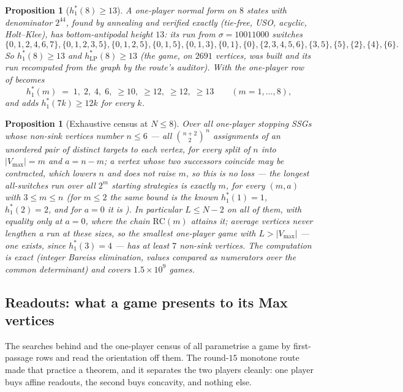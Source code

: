 \documentclass[11pt]{article}
\theoremstyle{plain}
\newtheorem{proposition}[theorem]{Proposition}
\theoremstyle{definition}
\newcommand{\Vmax}{V_{\max}}
\begin{document}
\begin{proposition}[$h^{\ast}_{1}(8)\ge13$]\label{prop:hstar-one-eight}
A one-player normal form on $8$ states with denominator $2^{44}$,
found by annealing and verified exactly (tie-free, USO, acyclic, Holt--Klee),
has bottom-antipodal height $13$: its run from $\sigma=10011000$ switches
\[
\{0,1,2,4,6,7\},\{0,1,2,3,5\},\{0,1,2,5\},\{0,1,5\},\{0,1,3\},\{0,1\},\{0\},
\{2,3,4,5,6\},\{3,5\},\{5\},\{2\},\{4\},\{6\}.
\]
So $h^{\ast}_{1}(8)\ge13$ and $h^{\ast}_{\mathrm{LP}}(8)\ge13$ (the game,
on $2691$ vertices, was built and its run recomputed from the graph by
the route's auditor). With
 the one-player row of  becomes
\[
  h^{\ast}_{1}(m)\;=\;1,\;2,\;4,\;6,\;\ge10,\;\ge12,\;\ge12,\;\ge13\qquad(m=1,\dots,8),
\]
and  adds $h^{\ast}_{1}(7k)\ge12k$ for every $k$.
\end{proposition}

\begin{proposition}[Exhaustive census at $N\le8$]\label{prop:oneplayer-census-small}
Over \emph{all} one-player stopping SSGs whose non-sink vertices number
$n\le 6$ --- all $\binom{n+2}{2}^{\,n}$ assignments of an unordered pair of
\emph{distinct} targets to each vertex, for every split of $n$ into $|\Vmax|=m$ and
$a=n-m$; a vertex whose two successors coincide may be contracted, which lowers $n$
and does not raise $m$, so this is no loss --- the longest all-switches run over all
$2^{m}$ starting strategies is exactly $m$, for every $(m,a)$ with $3\le m\le n$
(for $m\le2$ the same bound is the known $h^{\ast}_{1}(1)=1$, $h^{\ast}_{1}(2)=2$, and
for $a=0$ it is ). In particular $L\le N-2$ on all of them,
with equality only at $a=0$, where the chain $\mathrm{RC}(m)$ attains it; average
vertices never lengthen a run at these sizes, so the smallest one-player game with
$L>|\Vmax|$ --- one exists, since $h^{\ast}_{1}(3)=4$ --- has at least $7$ non-sink
vertices. The computation is exact (integer Bareiss elimination, values compared as
numerators over the common determinant) and covers $1.5\times10^{9}$ games.
\end{proposition}

\subsection{Readouts: what a game presents to its Max vertices}\label{sec:readouts}

The searches behind  and the
one-player census of  all parametrise a game by
first-passage rows and read the orientation off them. The round-$15$
monotone route made that practice a theorem, and it separates the two
players cleanly: one player buys affine readouts, the second buys
concavity, and nothing else.
\end{document}
